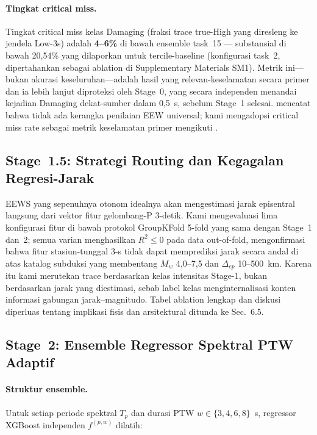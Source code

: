 \documentclass[10pt]{article}
\begin{document}
\paragraph{Tingkat critical miss.} Tingkat critical miss kelas Damaging (fraksi trace true-High yang diresleng ke jendela Low-3s) adalah \textbf{4--6\%} di bawah ensemble task~15 --- substansial di bawah 20,54\% yang dilaporkan untuk tercile-baseline (konfigurasi task~2, dipertahankan sebagai ablation di Supplementary Materials SM1). Metrik ini---bukan akurasi keseluruhan---adalah hasil yang relevan-keselamatan secara primer dan ia lebih lanjut diproteksi oleh Stage~0, yang secara independen menandai kejadian Damaging dekat-sumber dalam 0,5~s, sebelum Stage~1 selesai. \citet{ref60} mencatat bahwa tidak ada kerangka penilaian EEW universal; kami mengadopsi critical miss rate sebagai metrik keselamatan primer mengikuti \citet{ref19}.


\subsection{Stage~1.5: Strategi Routing dan Kegagalan Regresi-Jarak}

EEWS yang sepenuhnya otonom idealnya akan mengestimasi jarak episentral langsung dari vektor fitur gelombang-P 3-detik. Kami mengevaluasi lima konfigurasi fitur di bawah protokol GroupKFold 5-fold yang sama dengan Stage~1 dan~2; semua varian menghasilkan $R^2 \leq 0$ pada data out-of-fold, mengonfirmasi bahwa fitur stasiun-tunggal 3-s tidak dapat memprediksi jarak secara andal di atas katalog subduksi yang membentang $M_w$ 4,0--7,5 dan $\Delta_{ep}$ 10--500~km. Karena itu kami merutekan trace berdasarkan kelas intensitas Stage-1, bukan berdasarkan jarak yang diestimasi, sebab label kelas menginternalisasi konten informasi gabungan jarak--magnitudo. Tabel ablation lengkap dan diskusi diperluas tentang implikasi fisis dan arsitektural ditunda ke Sec.~6.5.

\subsection{Stage~2: Ensemble Regressor Spektral PTW Adaptif}

\paragraph{Struktur ensemble.} Untuk setiap periode spektral \(T_p\) dan durasi PTW \(w \in \{3, 4, 6, 8\}\)~s, regressor XGBoost independen \(f^{(p,w)}\) dilatih:
\end{document}
